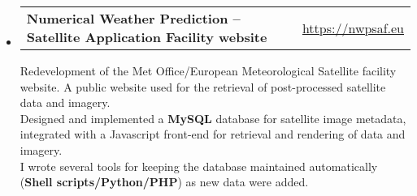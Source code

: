 \documentclass[10.5pt,a4]{article}
\makeatletter
\newcommand{\headerrow}[2]
{\begin{tabular*}{\linewidth}{l@{\extracolsep{\fill}}r}
	#1 &
	#2 \\
\end{tabular*}}
\makeatother
\begin{document}
\begin{itemize}
	
	\item
	\headerrow
		{\textbf{Numerical Weather Prediction -- Satellite Application Facility website}}
		{\url{https://nwpsaf.eu}}

		Redevelopment of the Met Office/European Meteorological Satellite facility website. A public website used for the retrieval of post-processed satellite data and imagery. \\
		Designed and implemented a \textbf{MySQL} database for satellite image metadata, integrated with a Javascript front-end for retrieval and rendering of data and imagery. \\
		I wrote several tools for keeping the database maintained automatically (\textbf{Shell scripts/Python/PHP}) as new data were added. 

\end{itemize}
\end{document}
